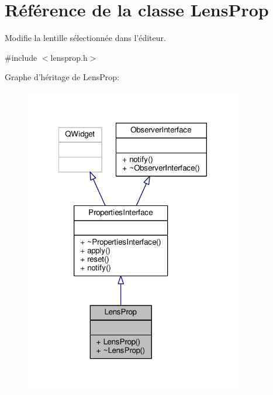 \hypertarget{classLensProp}{\section{Référence de la classe Lens\+Prop}
\label{classLensProp}
}


Modifie la lentille sélectionnée dans l’éditeur.  




{\ttfamily \#include $<$lensprop.\+h$>$}



Graphe d'héritage de Lens\+Prop\+:\nopagebreak
\begin{figure}[H]
\begin{center}
\leavevmode
\includegraphics[width=269pt]{d8/d9c/classLensProp__inherit__graph}
\end{center}
\end{figure}


